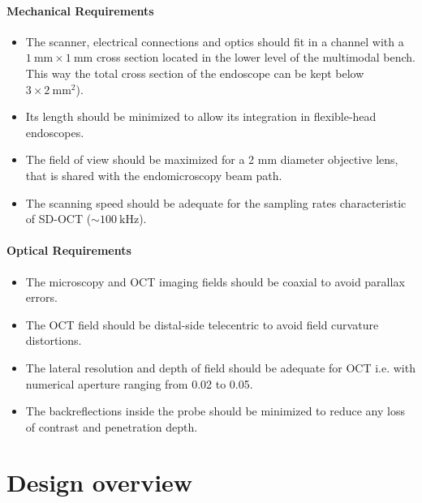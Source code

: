 \paragraph{Mechanical Requirements} 
\begin{itemize}

\item The scanner, electrical connections and optics should fit in a channel with a $\SI{1}{\milli\meter} \times \SI{1}{\milli\meter}$ cross section located in the lower level of the multimodal bench. This way the total cross section of the endoscope can be kept below $3 \times \SI{2}{\milli\meter^2}$). 
\item Its length should be minimized to allow its integration in flexible-head endoscopes.
\item The field of view should be maximized for a 2 mm diameter objective lens, that is shared with the endomicroscopy beam path.
\item The scanning speed should be adequate for the sampling rates characteristic of SD-OCT ($\sim \SI{100}{\kilo\hertz} $).
\end{itemize}


\paragraph{Optical Requirements}

\begin{itemize}
\item The microscopy and OCT imaging fields should be coaxial to avoid parallax errors. 
\item The OCT field should be distal-side telecentric to avoid field curvature distortions.
\item The lateral resolution and depth of field should be adequate for OCT i.e. with numerical aperture ranging from 0.02 to 0.05.
\item The backreflections inside the probe should be minimized to reduce any loss of contrast and penetration depth.
\end{itemize}

  

\section{Design overview}

